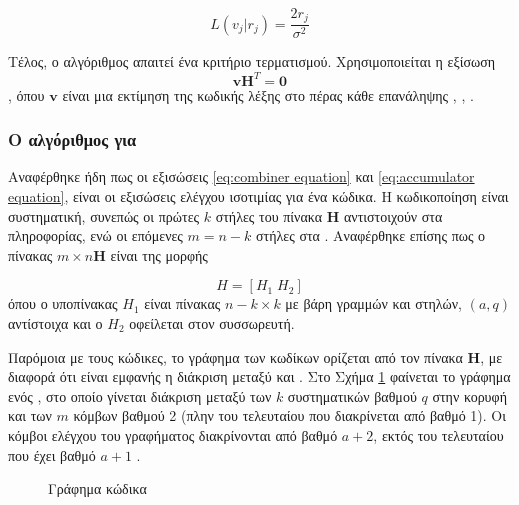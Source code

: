 \begin{equation}
L(v_j|r_j) = \frac{2r_j}{\sigma^2}
\label{eq:AWGN initial LLR}
\end{equation}

Τέλος, ο αλγόριθμος απαιτεί ένα κριτήριο τερματισμού. Χρησιμοποιείται η εξίσωση
\begin{equation*}
\mathbf{v}\mathbf{H}^T=\mathbf{0}
\end{equation*}
, όπου $\mathbf{v}$ είναι μια εκτίμηση της κωδικής λέξης στο πέρας κάθε επανάληψης \cite{ryan2009channel}, \cite{johnson2009iterative}, \cite{ta2013tutorial}.

\subsubsection{Ο  αλγόριθμος για }

Αναφέρθηκε ήδη πως οι εξισώσεις \ref{eq:combiner equation} και \ref{eq:accumulator equation}, είναι οι εξισώσεις ελέγχου ισοτιμίας για ένα  κώδικα. Η κωδικοποίηση είναι συστηματική, συνεπώς οι πρώτες $k$ στήλες του πίνακα $\mathbf{H}$ αντιστοιχούν στα  πληροφορίας, ενώ οι επόμενες $m=n-k$ στήλες στα . Αναφέρθηκε επίσης πως ο πίνακας $m\times n \mathbf{H}$ είναι της μορφής

\begin{equation}
H=[H_1\;H_2]
\label{eq:RA parity check matrix form}
\end{equation}
όπου ο υποπίνακας $H_1$ είναι πίνακας $n-k\times k$ με βάρη γραμμών και στηλών, $(a,q)$ αντίστοιχα και ο $H_2$ οφείλεται στον συσσωρευτή.

Παρόμοια με τους  κώδικες, το γράφημα  των  κωδίκων ορίζεται από τον πίνακα $\mathbf{H}$, με διαφορά ότι είναι εμφανής η διάκριση μεταξύ  και . Στο Σχήμα \ref{fig:RA tanner graph} φαίνεται το γράφημα  ενός , στο οποίο γίνεται διάκριση μεταξύ των $k$ συστηματικών  βαθμού $q$ στην κορυφή και των $m$  κόμβων βαθμού 2 (πλην του τελευταίου που διακρίνεται από βαθμό 1). Οι κόμβοι ελέγχου του γραφήματος διακρίνονται από βαθμό $a+2$, εκτός του τελευταίου που έχει βαθμό $a+1$ \cite{johnson2009iterative}.

\begin{figure}[H]
\caption{Γράφημα  κώδικα}
\label{fig:RA tanner graph}
\end{figure}

